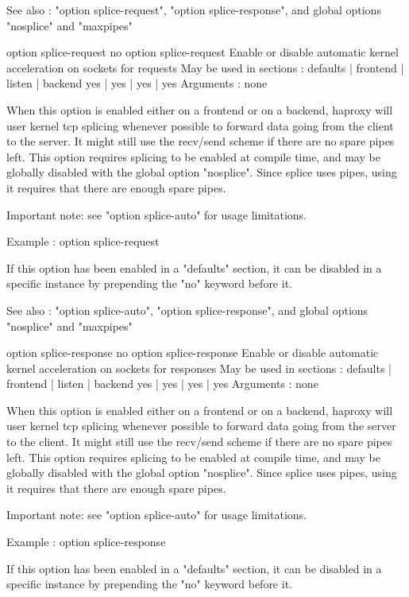   See also : "option splice-request", "option splice-response", and global
             options "nosplice" and "maxpipes"


option splice-request
no option splice-request
  Enable or disable automatic kernel acceleration on sockets for requests
  May be used in sections :   defaults | frontend | listen | backend
                                 yes   |    yes   |   yes  |   yes
  Arguments : none

  When this option is enabled either on a frontend or on a backend, haproxy
  will user kernel tcp splicing whenever possible to forward data going from
  the client to the server. It might still use the recv/send scheme if there
  are no spare pipes left. This option requires splicing to be enabled at
  compile time, and may be globally disabled with the global option "nosplice".
  Since splice uses pipes, using it requires that there are enough spare pipes.

  Important note: see "option splice-auto" for usage limitations.

  Example :
        option splice-request

  If this option has been enabled in a "defaults" section, it can be disabled
  in a specific instance by prepending the "no" keyword before it.

  See also : "option splice-auto", "option splice-response", and global options
             "nosplice" and "maxpipes"


option splice-response
no option splice-response
  Enable or disable automatic kernel acceleration on sockets for responses
  May be used in sections :   defaults | frontend | listen | backend
                                 yes   |    yes   |   yes  |   yes
  Arguments : none

  When this option is enabled either on a frontend or on a backend, haproxy
  will user kernel tcp splicing whenever possible to forward data going from
  the server to the client. It might still use the recv/send scheme if there
  are no spare pipes left. This option requires splicing to be enabled at
  compile time, and may be globally disabled with the global option "nosplice".
  Since splice uses pipes, using it requires that there are enough spare pipes.

  Important note: see "option splice-auto" for usage limitations.

  Example :
        option splice-response

  If this option has been enabled in a "defaults" section, it can be disabled
  in a specific instance by prepending the "no" keyword before it.


